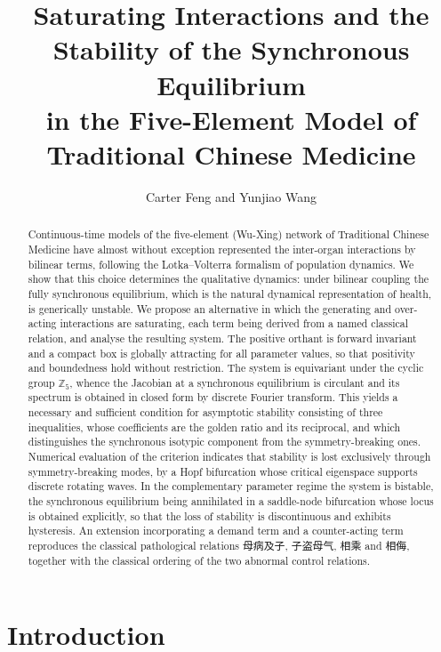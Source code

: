 \documentclass[11pt]{article}
\title{Saturating Interactions and the Stability of the Synchronous Equilibrium\\
	in the Five-Element Model of Traditional Chinese Medicine}
\author{Carter Feng and Yunjiao Wang}
\newcommand{\Z}{{\mathbb{Z}}}
\theoremstyle{definition}
\theoremstyle{remark}
\begin{document}
	\maketitle
	
	\begin{abstract}
		Continuous-time models of the five-element (Wu-Xing) network of Traditional Chinese
		Medicine have almost without exception represented the inter-organ interactions by
		bilinear terms, following the Lotka--Volterra formalism of population dynamics. We
		show that this choice determines the qualitative dynamics: under bilinear coupling
		the fully synchronous equilibrium, which is the natural dynamical representation of
		health, is generically unstable. We propose an alternative in which the generating
		and over-acting interactions are saturating, each term being derived from a named
		classical relation, and analyse the resulting system. The positive orthant is
		forward invariant and a compact box is globally attracting for all parameter values,
		so that positivity and boundedness hold without restriction. The system is
		equivariant under the cyclic group $\Z_5$, whence the Jacobian at a synchronous
		equilibrium is circulant and its spectrum is obtained in closed form by discrete
		Fourier transform. This yields a necessary and sufficient condition for asymptotic
		stability consisting of three inequalities, whose coefficients are the golden ratio
		and its reciprocal, and which distinguishes the synchronous isotypic component from
		the symmetry-breaking ones. Numerical evaluation of the criterion indicates that
		stability is lost exclusively through symmetry-breaking modes, by a Hopf bifurcation
		whose critical eigenspace supports discrete rotating waves. In the complementary
		parameter regime the system is bistable, the synchronous equilibrium being
		annihilated in a saddle-node bifurcation whose locus is obtained explicitly, so that
		the loss of stability is discontinuous and exhibits hysteresis. An extension
		incorporating a demand term and a counter-acting term reproduces the classical
		pathological relations 母病及子, 子盗母气, 相乘 and 相侮,
		together with the classical ordering of the two abnormal control relations.
	\end{abstract}
	
	\tableofcontents
	\newpage
	
	\section{Introduction}\label{sec:intro}
	
\end{document}
